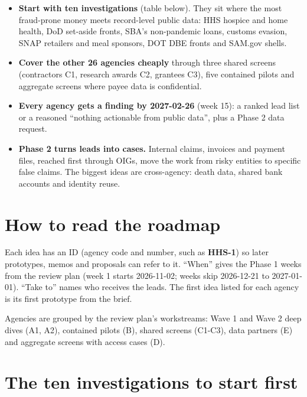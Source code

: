 \documentclass[letterpaper,11pt]{article}
\providecommand{\tightlist}{\setlength{\itemsep}{0pt}\setlength{\parskip}{0pt}}
\begin{document}
\begin{itemize}
\tightlist
\item
  \textbf{Start with ten investigations} (table below). They sit where
  the most fraud-prone money meets record-level public data: HHS hospice
  and home health, DoD set-aside fronts, SBA's non-pandemic loans,
  customs evasion, SNAP retailers and meal sponsors, DOT DBE fronts and
  SAM.gov shells.
\item
  \textbf{Cover the other 26 agencies cheaply} through three shared
  screens (contractors C1, research awards C2, grantees C3), five
  contained pilots and aggregate screens where payee data is
  confidential.
\item
  \textbf{Every agency gets a finding by 2027-02-26} (week 15): a ranked
  lead list or a reasoned ``nothing actionable from public data'', plus
  a Phase 2 data request.
\item
  \textbf{Phase 2 turns leads into cases.} Internal claims, invoices and
  payment files, reached first through OIGs, move the work from risky
  entities to specific false claims. The biggest ideas are cross-agency:
  death data, shared bank accounts and identity reuse.
\end{itemize}

\hypertarget{how-to-read-the-roadmap}{%
\section{How to read the roadmap}\label{how-to-read-the-roadmap}}

Each idea has an ID (agency code and number, such as \textbf{HHS-1}) so
later prototypes, memos and proposals can refer to it. ``When'' gives
the Phase 1 weeks from the review plan (week 1 starts 2026-11-02; weeks
skip 2026-12-21 to 2027-01-01). ``Take to'' names who receives the
leads. The first idea listed for each agency is its first prototype from
the brief.

Agencies are grouped by the review plan's workstreams: Wave 1 and Wave 2
deep dives (A1, A2), contained pilots (B), shared screens (C1-C3), data
partners (E) and aggregate screens with access cases (D).

\hypertarget{the-ten-investigations-to-start-first}{%
\section{The ten investigations to start
first}\label{the-ten-investigations-to-start-first}}
\end{document}
